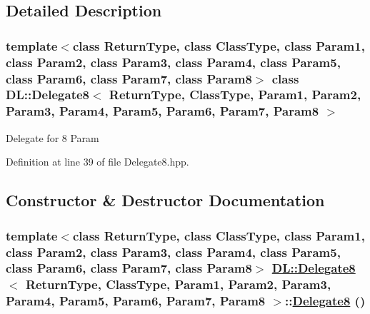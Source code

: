 \subsection{Detailed Description}
\subsubsection*{template$<$class Return\-Type, class Class\-Type, class Param1, class Param2, class Param3, class Param4, class Param5, class Param6, class Param7, class Param8$>$ class DL::Delegate8$<$ Return\-Type, Class\-Type, Param1, Param2, Param3, Param4, Param5, Param6, Param7, Param8 $>$}

Delegate for 8 Param



Definition at line 39 of file Delegate8.hpp.

\subsection{Constructor \& Destructor Documentation}
\hypertarget{classDL_1_1Delegate8_d0}{
\subsubsection[Delegate8]{\setlength{\rightskip}{0pt plus 5cm}template$<$class Return\-Type, class Class\-Type, class Param1, class Param2, class Param3, class Param4, class Param5, class Param6, class Param7, class Param8$>$ \hyperlink{classDL_1_1Delegate8}{DL::Delegate8}$<$ Return\-Type, Class\-Type, Param1, Param2, Param3, Param4, Param5, Param6, Param7, Param8 $>$::\hyperlink{classDL_1_1Delegate8}{Delegate8} ()}}
\label{classDL_1_1Delegate8_d0}




